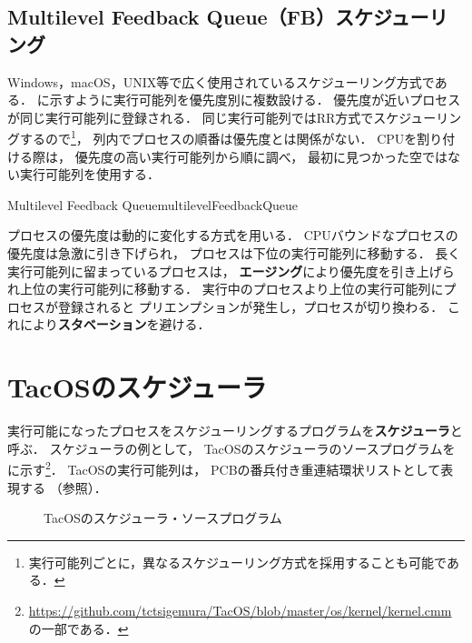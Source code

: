 \subsection{Multilevel Feedback Queue（FB）スケジューリング}
Windows，macOS，UNIX等で広く使用されているスケジューリング方式である．
に示すように実行可能列を優先度別に複数設ける．
優先度が近いプロセスが同じ実行可能列に登録される．
同じ実行可能列ではRR方式でスケジューリングするので\footnote{
実行可能列ごとに，異なるスケジューリング方式を採用することも可能である．
}，
列内でプロセスの順番は優先度とは関係がない．
CPUを割り付ける際は，
優先度の高い実行可能列から順に調べ，
最初に見つかった空ではない実行可能列を使用する．

{Multilevel Feedback Queue}{multilevelFeedbackQueue}

プロセスの優先度は動的に変化する方式を用いる．
CPUバウンドなプロセスの優先度は急激に引き下げられ，
プロセスは下位の実行可能列に移動する．
長く実行可能列に留まっているプロセスは，
{\bf エージング}により優先度を引き上げられ上位の実行可能列に移動する．
実行中のプロセスより上位の実行可能列にプロセスが登録されると
プリエンプションが発生し，プロセスが切り換わる．
これにより{\bf スタベーション}を避ける．

\section{TacOSのスケジューラ}
実行可能になったプロセスをスケジューリングするプログラムを{\bf スケジューラ}と呼ぶ．
スケジューラの例として，
TacOSのスケジューラのソースプログラムをに示す\footnote{
\url{https://github.com/tctsigemura/TacOS/blob/master/os/kernel/kernel.cmm}
の一部である．}．
TacOSの実行可能列は，
PCBの番兵付き重連結環状リストとして表現する
（参照）．

\begin{figure}[btp]

\caption{TacOSのスケジューラ・ソースプログラム}
\label{fig:tacosSch}
\end{figure}

